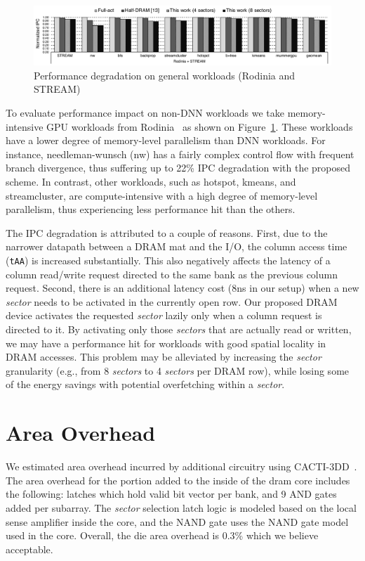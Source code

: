 \begin{figure}[t]
    \centering
        \includegraphics[width=\linewidth]{figure/perf-2.pdf}
    \caption{Performance degradation on general workloads (Rodinia and STREAM)}
    \label{fig:ch4:perf_gen}
\end{figure}

To evaluate performance impact on non-DNN workloads we take memory-intensive GPU workloads from Rodinia~ as shown on Figure~\ref{fig:ch4:perf_gen}. These workloads have a lower degree of memory-level parallelism than DNN workloads. For instance, needleman-wunsch (nw) has a fairly complex control flow with frequent branch divergence, thus suffering up to 22\% IPC degradation with the proposed scheme. In contrast, other workloads, such as hotspot, kmeans, and streamcluster, are compute-intensive with a high degree of memory-level parallelism, thus experiencing less performance hit than the others.


The IPC degradation is attributed to a couple of reasons. First, due to the narrower datapath between a DRAM mat and the I/O, the column access time (\texttt{tAA}) is increased substantially. This also negatively affects the latency of a column read/write request directed to the same bank as the previous column request. Second, there is an additional latency cost (8ns in our setup) when a new {\it sector} needs to be activated in the currently open row. Our proposed DRAM device activates the requested {\it sector} lazily only when a column request is directed to it. By activating only those {\it sectors} that are actually read or written, we may have a performance hit for workloads with good spatial locality in DRAM accesses. This problem may be alleviated by increasing the {\it sector} granularity (e.g., from 8 {\it sectors} to 4 {\it sectors} per DRAM row), while losing some of the energy savings with potential overfetching within a {\it sector}.

\section{Area Overhead}
We estimated area overhead incurred by additional circuitry using CACTI-3DD~.
The area overhead for the portion added to the inside of the dram core includes the following:
latches which hold valid bit vector per bank, and 9 AND gates added per subarray.
The \textit{sector} selection latch logic is modeled based on the local sense amplifier inside the core, 
and the NAND gate uses the NAND gate model used in the core.
Overall, the die area overhead is 0.3\% which we believe acceptable.
